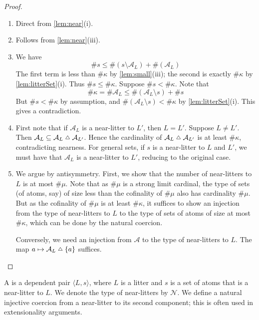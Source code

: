 \begin{proof}
    \begin{enumerate}
        \item Direct from \cref{lem:near}(i).
        \item Follows from \cref{lem:near}(iii).
        \item We have
        \[ \#s \leq \#(s \setminus \mathcal A_L) + \#(\mathcal A_L) \]
        The first term is less than \( \#\kappa \) by \cref{lem:small}(iii); the second is exactly \( \#\kappa \) by \cref{lem:litterSet}(i).
        Thus \( \#s \leq \#\kappa \).
        Suppose \( \#s < \#\kappa \).
        Note that
        \[ \#\kappa = \#\mathcal A_L \leq \#(\mathcal A_L \setminus s) + \#s \]
        But \( \#s < \#\kappa \) by assumption, and \( \#(\mathcal A_L \setminus s) < \#\kappa \) by \cref{lem:litterSet}(i).
        This gives a contradiction.
        \item First note that if \( \mathcal A_L \) is a near-litter to \( L' \), then \( L = L' \).
        Suppose \( L \neq L' \).
        Then \( \mathcal A_L \subseteq \mathcal A_L \symmdiff \mathcal A_{L'} \).
        Hence the cardinality of \( \mathcal A_L \symmdiff \mathcal A_{L'} \) is at least \( \#\kappa \), contradicting nearness.
        For general sets, if \( s \) is a near-litter to \( L \) and \( L' \), we must have that \( \mathcal A_L \) is a near-litter to \( L' \), reducing to the original case.
        \item We argue by antisymmetry.
        First, we show that the number of near-litters to \( L \) is at most \( \#\mu \).
        Note that as \( \#\mu \) is a strong limit cardinal, the type of sets (of atoms, say) of size less than the cofinality of \( \#\mu \) also has cardinality \( \#\mu \).
        But as the cofinality of \( \#\mu \) is at least \( \#\kappa \), it suffices to show an injection from the type of near-litters to \( L \) to the type of sets of atoms of size at most \( \#\kappa \), which can be done by the natural coercion.

        Conversely, we need an injection from \( \mathcal A \) to the type of near-litters to \( L \).
        The map \( a \mapsto \mathcal A_L \symmdiff \qty{a} \) suffices.
    \end{enumerate}
\end{proof}
\begin{definition}
    A  is a dependent pair \( \langle L, s \rangle \), where \( L \) is a litter and \( s \) is a set of atoms that is a near-litter to \( L \).
    We denote the type of near-litters by \( \mathcal N \).
    We define a natural injective coercion from a near-litter to its second component; this is often used in extensionality arguments.
\end{definition}
